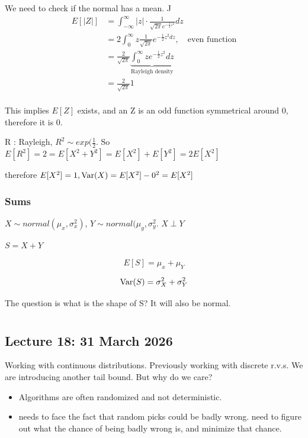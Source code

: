\documentclass{report}
\begin{document}
We need to check if the normal has a mean. J
\begin{align*}
	E[|Z|] &= \int_{-\infty}^{\infty}\vert z \vert \cdot \frac{1}{\sqrt{2\pi}e^{-\frac{1}{2}z^{2}}}dz \\
	       &=  2 \int_{0}^{\infty } z \frac{1}{\sqrt{2\pi}} e^{-\frac{1}{2}z^{2} dz} , \quad \text{even function}\\
	       &= \frac{2}{\sqrt{2\pi}} \underbrace{\int_{0}^{\infty } z e^{-\frac{1}{2} z^{2}}dz}_{\text{Rayleigh density}} \\
	       &=  \frac{2}{\sqrt{2\pi}} 1\\
\end{align*}

This implies $ E[Z] $ exists, and an Z is an odd function symmetrical around 0, therefore it is 0.



R : Rayleigh, $ R^{2} \sim exp(\frac{1}{2} $. So $ E[R^{2}] = 2 = E[X^{2} + Y^{2}] =  E[X^{2}] + E[Y^{2}] = 2E[X^{2}] $ 

therefore $ E[X^{2}] = 1, \operatorname{Var}(X) = E[X^{2}] - 0^{2} = E[X^{2}] $ 

\subsection{Sums} 
$ X \sim normal(\mu _{x}, \sigma_{x}^{2})$, $ Y \sim normal(\mu _{y}, \sigma_{y}^{2} $. $ X \perp Y $ 

$ S = X + Y$

\[
	E[S] = \mu _{x} + \mu _{Y}
\]

\[
\operatorname{Var}(S) = \sigma_{X}^{2} + \sigma_{Y}^{2}
\]

The question is what is the shape of S? It will also be normal. 



\chapter{}
\section{Lecture 18: 31 March 2026}

Working with continuous distributions. Previously working with discrete r.v.s. We are introducing another tail bound. But why do we care? 

\begin{itemize}
	\item Algorithms are often randomized and not deterministic. 
	\item needs to face the fact that random picks could be badly wrong. need to figure out what the chance of being badly wrong is, and minimize that chance. 
\end{itemize}
\end{document}
